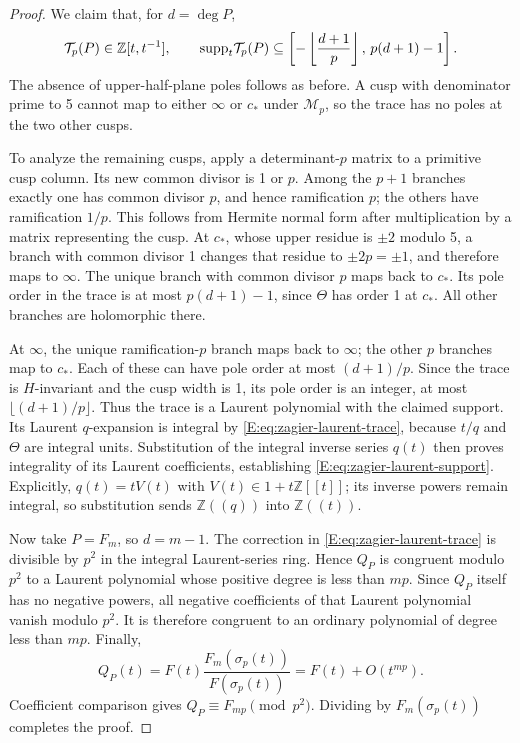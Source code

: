 \documentclass[11pt,a4paper]{article}
\theoremstyle{definition}\newtheorem{definition}[theorem]{Definition}
\theoremstyle{remark}\newtheorem{remark}[theorem]{Remark}
\numberwithin{equation}{section}
\begin{document}
\begin{proof}
We claim that, for \(d=\deg P\),
\begin{equation}\label{E:eq:zagier-laurent-support}
 \mathcal T_p(P)\in\mathbb Z[t,t^{-1}],
 \qquad
 {\rm supp}_t\mathcal T_p(P)
 \subseteq
 \left[-\left\lfloor\frac{d+1}{p}\right\rfloor,\,
             p(d+1)-1\right].
\end{equation}
The absence of upper-half-plane poles follows as before.
A cusp with denominator prime to 5 cannot map to either
\(\infty\) or \(c_*\) under \(\mathcal M_p\), so the trace
has no poles at the two other cusps.

To analyze the remaining cusps, apply a determinant-\(p\)
matrix to a primitive cusp column.  Its new common divisor
is 1 or \(p\).  Among the \(p+1\) branches exactly one has
common divisor \(p\), and hence ramification \(p\); the others
have ramification \(1/p\).  This follows from Hermite normal
form after multiplication by a matrix representing the cusp.
At \(c_*\), whose upper residue is \(\pm2\) modulo 5,
a branch with common divisor 1 changes that residue to
\(\pm2p=\pm1\), and therefore maps to \(\infty\).
The unique branch with common divisor \(p\) maps back to
\(c_*\).  Its pole order in the trace is at most
\(p(d+1)-1\), since \(\Theta\) has order 1 at \(c_*\).
All other branches are holomorphic there.

At \(\infty\), the unique ramification-\(p\) branch maps
back to \(\infty\); the other \(p\) branches map to \(c_*\).
Each of these can have pole order at most \((d+1)/p\).
Since the trace is \(H\)-invariant and the cusp width is 1,
its pole order is an integer, at most
\(\lfloor(d+1)/p\rfloor\).
Thus the trace is a Laurent polynomial with the claimed
support.  Its Laurent \(q\)-expansion is integral by
\eqref{E:eq:zagier-laurent-trace}, because
\(t/q\) and \(\Theta\) are integral units.
Substitution of the integral inverse series \(q(t)\)
then proves integrality of its Laurent coefficients,
establishing \eqref{E:eq:zagier-laurent-support}.
Explicitly, \(q(t)=tV(t)\) with
\(V(t)\in1+t\mathbb Z[[t]]\); its inverse powers remain integral,
so substitution sends \(\mathbb Z((q))\) into \(\mathbb Z((t))\).

Now take \(P=F_m\), so \(d=m-1\).
The correction in \eqref{E:eq:zagier-laurent-trace} is
divisible by \(p^2\) in the integral Laurent-series ring.
Hence \(Q_P\) is congruent modulo \(p^2\) to a Laurent
polynomial whose positive degree is less than \(mp\).
Since \(Q_P\) itself has no negative powers, all negative
coefficients of that Laurent polynomial vanish modulo \(p^2\).
It is therefore congruent to an ordinary polynomial
of degree less than \(mp\).
Finally,
\[
 Q_P(t)=F(t)\frac{F_m(\sigma_p(t))}{F(\sigma_p(t))}
       =F(t)+O(t^{mp}).
\]
Coefficient comparison gives \(Q_P\equiv F_{mp}\pmod{p^2}\).
Dividing by \(F_m(\sigma_p(t))\) completes the proof.
\end{proof}
\end{document}
